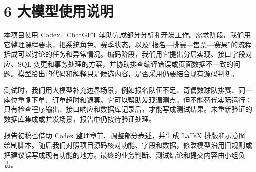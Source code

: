 \documentclass[UTF8,zihao=-4,a4paper]{ctexart}
\begin{document}
\section*{6 大模型使用说明}

本项目使用 Codex／ChatGPT 辅助完成部分分析和开发工作。需求阶段，我们用它整理课程要求，把系统角色、赛季状态，以及“报名—排赛—售票—赛果”的流程拆成可以讨论的任务和异常情况。编码阶段，我们用它提出分层实现、接口字段对应、SQL 变更和事务处理的方案，并协助排查编译错误或页面数据不一致的问题。模型给出的代码和解释只是候选内容，是否采用仍要结合现有源码判断。


测试时，我们用大模型补充边界场景，例如报名队伍不足、奇偶数球队排赛、同一座位重复下单、订单超时和退票。它可以帮助发现漏测点，但不能替代实际运行；只有检查程序输出、接口响应和数据库记录后，才能写成测试结果。未重新验证的数据库集成或并发场景，报告中仍按待验证处理。


报告初稿也借助 Codex 整理章节、调整部分表述，并生成 LaTeX 排版和示意图绘制脚本。随后我们对照项目源码核对功能、字段和数据，修改模型沿用旧规则或把建议误写成现有功能的地方。最终的业务判断、测试结论和提交内容由小组负责。
\end{document}
